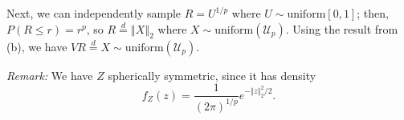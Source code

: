 \documentclass[11pt]{article}
\newcommand{\norm}[1]{\left\Vert #1 \right\Vert}
\begin{document}
\begin{enumerate}
\begin{enumerate}
            Next, we can independently sample $R = U^{1 / p}$ where $U \sim
            \text{uniform}[0, 1]$; then, $P(R \leq r) = r^p$, so $R
            \overset{d}{=} \norm{X}_2$ where $X \sim
            \text{uniform}(\mathcal{U}_p)$.
            Using the result from (b), we have $VR \overset{d}{=} X \sim
            \text{uniform}(\mathcal{U}_p)$.

            \emph{Remark:} We have $Z$ spherically symmetric, since it has density \[
                f_Z(z) = \frac{1}{(2\pi)^{1 / p}} e^{-\norm{z}_2^2 / 2}.
            \] 
        \end{enumerate}

    \end{enumerate}
\end{document}
